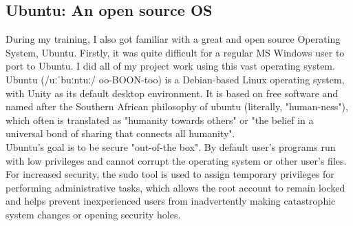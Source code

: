 \subsection{Ubuntu: An open source OS}
During my training, I also got familiar with a great and open source Operating System, Ubuntu. Firstly, it was quite difficult for a regular MS Windows user to port to Ubuntu. I did all of my project work using this vast operating system. 
Ubuntu (/uːˈbuːntuː/ oo-BOON-too) is a Debian-based Linux operating system, with Unity as its default desktop environment. It is based on free software and named after the Southern African philosophy of ubuntu (literally, "human-ness"), which often is translated as "humanity towards others" or "the belief in a universal bond of sharing that connects all humanity".\\

Ubuntu's goal is to be secure "out-of-the box". By default user's programs run with low privileges and cannot corrupt the operating system or other user's files. For increased security, the sudo tool is used to assign temporary privileges for performing administrative tasks, which allows the root account to remain locked and helps prevent inexperienced users from inadvertently making catastrophic system changes or opening security holes.\\
